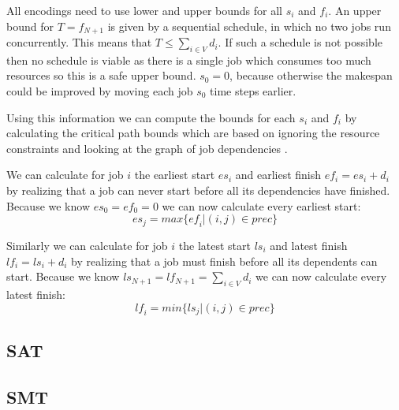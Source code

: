 \documentclass{sig-alternate}
\newcommand{\mli}[1]{\mathit{#1}}
\begin{document}
All encodings need to use lower and upper bounds for all $s_i$ and $f_i$.
An upper bound for $T = f_{N+1}$ is given by a sequential schedule, in which no two jobs run concurrently.
This means that $T \leq \sum_{i \in V}{d_i}$.
If such a schedule is not possible then no schedule is viable as there is a single job which consumes too much resources so this is a safe upper bound.
$s_0 = 0$, because otherwise the makespan could be improved by moving each job $s_0$ time steps earlier.

Using this information we can compute the bounds for each $s_i$ and $f_i$ by calculating the critical path bounds  which are based on ignoring the resource constraints and looking at the graph of job dependencies \cite{klein1999computing}.

We can calculate for job $i$ the earliest start $es_i$ and earliest finish $ef_i = es_i + d_i$ by realizing that a job can never start before all its dependencies have finished.
Because we know $es_0 = ef_0 = 0$ we can now calculate every earliest start:
$$\mli{es}_j = max\{\mli{ef}_i | (i,j) \in prec\}$$

Similarly we can calculate for job $i$ the latest start $ls_i$ and latest finish $lf_i = ls_i + d_i$ by realizing that a job must finish before all its dependents can start.
Because we know $ls_{N+1} = lf_{N+1} = \sum_{i \in V}{d_i}$ we can now calculate every latest finish:
$$\mli{lf}_i = min\{\mli{ls}_j | (i,j) \in prec\}$$

\subsection{SAT}

\subsection{SMT}
\end{document}
